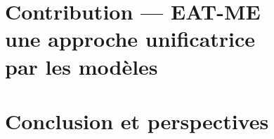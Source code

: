 \documentclass[a4paper,11pt,twoside]{book}
\begin{document}
    \part[Contribution — EAT-ME~: une approche unificatrice]%
         {Contribution — EAT-ME \\ une approche unificatrice \\par les modèles}
    
    
    
    \part{Conclusion et perspectives}
    
    
    \backmatter
    \appendix
    \printglossaries
    
    
\end{document}
